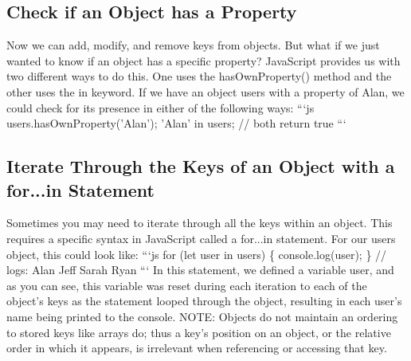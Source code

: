 \documentclass{article}%
\begin{document}
%
\subsection{Check if an Object has a Property}%
\label{subsec:CheckifanObjecthasaProperty}%
Now we can add, modify, and remove keys from objects. But what if we just wanted to know if an object has a specific property? JavaScript provides us with two different ways to do this. One uses the hasOwnProperty() method and the other uses the in keyword. If we have an object users with a property of Alan, we could check for its presence in either of the following ways:\newline%
```js\newline%
users.hasOwnProperty('Alan');\newline%
'Alan' in users;\newline%
// both return true\newline%
```\newline%

%
\subsection{Iterate Through the Keys of an Object with a for...in Statement}%
\label{subsec:IterateThroughtheKeysofanObjectwithafor...inStatement}%
Sometimes you may need to iterate through all the keys within an object. This requires a specific syntax in JavaScript called a for...in statement. For our users object, this could look like:\newline%
```js\newline%
for (let user in users) \{\newline%
  console.log(user);\newline%
\}\newline%
// logs:\newline%
Alan\newline%
Jeff\newline%
Sarah\newline%
Ryan\newline%
```\newline%
In this statement, we defined a variable user, and as you can see, this variable was reset during each iteration to each of the object's keys as the statement looped through the object, resulting in each user's name being printed to the console.\newline%
NOTE: Objects do not maintain an ordering to stored keys like arrays do; thus a key's position on an object, or the relative order in which it appears, is irrelevant when referencing or accessing that key.\newline%
\end{document}
